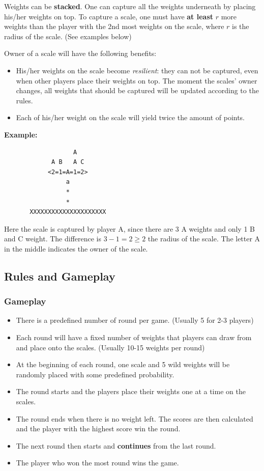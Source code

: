 \documentclass[12pt]{article}
\begin{document}
Weights can be \textbf{stacked}. One can capture all the weights underneath by
placing his/her weights on top. To capture a scale, one must have \textbf{at
least} $r$ more weights than the player with the 2nd most weights on the scale,
where $r$ is the radius of the scale. (See examples below)

Owner of a scale will have the following benefits:
\begin{itemize}
  \item His/her weights on the scale become \textit{resilient}: they can not be
    captured, even when other players place their weights on top. The moment the
    scales' owner changes, all weights that should be captured will be updated
    according to the rules.
  \item Each of his/her weight on the scale will yield twice the amount of
    points.
\end{itemize}

\textbf{Example:}
\begin{verbatim}
                   A
             A B   A C
            <2=1=A=1=2>
                 a     
                 *     
                 *    
       XXXXXXXXXXXXXXXXXXXXX
\end{verbatim}

Here the scale is captured by player A, since there are 3 A weights and only 1 B
and C weight. The difference is $3 - 1 = 2 \geq 2$ the radius of the scale. The
letter A in the middle indicates the owner of the scale.


\subsection{Rules and Gameplay} 
\subsubsection{Gameplay}
\begin{itemize}
  \item There is a predefined number of round per game. (Usually 5 for 2-3
    players)
  \item Each round will have a fixed number of weights that players can draw
    from and place onto the scales. (Usually 10-15 weights per round)
  \item At the beginning of each round, one scale and 5 wild weights will be
    randomly placed with some predefined probability.
  \item The round starts and the players place their weights one at a time on
    the scales. 
  \item The round ends when there is no weight left. The scores are then
    calculated and the player with the highest score win the round.
  \item The next round then starts and \textbf{continues} from the last round.
  \item The player who won the most round wins the game.
\end{itemize}
\end{document}
